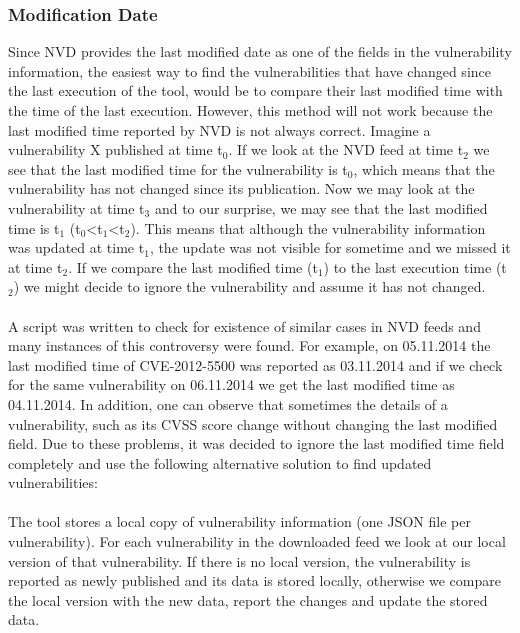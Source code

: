 \subsubsection{Modification Date}
Since NVD provides the last modified date as one of the fields in the vulnerability information, the easiest way to find the vulnerabilities that have changed since the last execution of the tool, would be to compare their last modified time with the time of the last execution. However, this method will not work because the last modified time reported by NVD is not always correct. Imagine a vulnerability X published at time t$_{\text{0}}$. If we look at the NVD feed at time t$_{\text{2}}$ we see that the last modified time for the vulnerability is t$_{\text{0}}$, which means that the vulnerability has not changed since its publication. Now we may look at the vulnerability at time t$_{\text{3}}$ and to our surprise, we may see that the last modified time is t$_{\text{1}}$  (t$_{\text{0}}$<t$_{\text{1}}$<t$_{\text{2}}$). This means that although the vulnerability information was updated at time t$_{\text{1}}$, the update was not visible for sometime and we missed it at time t$_{\text{2}}$. If we compare the last modified time (t$_{\text{1}}$) to the last execution time (t$_{\text{2}}$) we might decide to ignore the vulnerability and assume it has not changed. 
\paragraph{}
A script was written to check for existence of similar cases in NVD feeds and many instances of this controversy were found. For example, on 05.11.2014 the last modified time of CVE-2012-5500 was reported as 03.11.2014 and if we check for the same vulnerability on 06.11.2014 we get the last modified time as 04.11.2014. In addition, one can observe that sometimes the details of a vulnerability, such as its CVSS score change without changing the last modified field. Due to these problems, it was decided to ignore the last modified time field completely and use the following alternative solution to find updated vulnerabilities:
\paragraph{}
The tool stores a local copy of vulnerability information (one JSON file per vulnerability). For each vulnerability in the downloaded feed we look at our local version of that vulnerability. If there is no local version, the vulnerability is reported as newly published and its data is stored locally, otherwise we compare the local version with the new data, report the changes and update the stored data.
